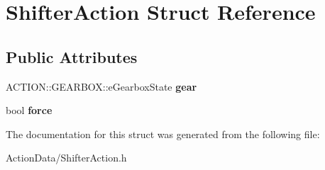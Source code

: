 \hypertarget{struct_shifter_action}{
\section{\-Shifter\-Action \-Struct \-Reference}
\label{struct_shifter_action}
}
\subsection*{\-Public \-Attributes}
\begin{DoxyCompactItemize}
\item 
\hypertarget{struct_shifter_action_ab12c2333c10afd6ea0a38788e48c573c}{
\-A\-C\-T\-I\-O\-N\-::\-G\-E\-A\-R\-B\-O\-X\-::e\-Gearbox\-State {\bfseries gear}}
\label{struct_shifter_action_ab12c2333c10afd6ea0a38788e48c573c}

\item 
\hypertarget{struct_shifter_action_aaae0cc2462c5e22ed48e8deb8f5143e4}{
bool {\bfseries force}}
\label{struct_shifter_action_aaae0cc2462c5e22ed48e8deb8f5143e4}

\end{DoxyCompactItemize}


\-The documentation for this struct was generated from the following file\-:\begin{DoxyCompactItemize}
\item 
\-Action\-Data/\-Shifter\-Action.\-h\end{DoxyCompactItemize}
